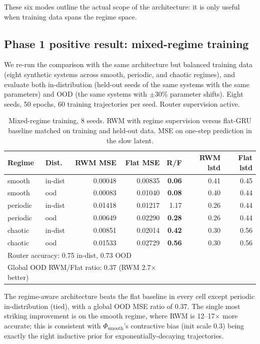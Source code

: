 \documentclass[11pt,a4paper]{article}
\begin{document}
These six modes outline the actual scope of the architecture: it is
only useful when training data spans the regime space.

\subsection{Phase 1 positive result: mixed-regime training}
\label{sec:rwm-mixed}

We re-run the comparison with the same architecture but balanced
training data (eight synthetic systems across smooth, periodic, and
chaotic regimes), and evaluate both in-distribution (held-out seeds of
the same systems with the same parameters) and OOD (the same systems
with $\pm$30\% parameter shifts). Eight seeds, 50 epochs, 60 training
trajectories per seed. Router supervision active.

\begin{table}[h]
\centering
\caption{Mixed-regime training, 8 seeds. RWM with regime supervision
versus flat-GRU baseline matched on training and held-out data. MSE
on one-step prediction in the slow latent.}
\label{tab:rwm-mixed}
\begin{tabular}{llrrrrr}
\toprule
Regime & Dist. & RWM MSE & Flat MSE & R/F & RWM lstd & Flat lstd \\
\midrule
smooth   & in-dist & 0.00048 & 0.00835 & \textbf{0.06} & 0.41 & 0.45 \\
smooth   & ood     & 0.00083 & 0.01040 & \textbf{0.08} & 0.40 & 0.44 \\
periodic & in-dist & 0.01418 & 0.01217 & 1.17 & 0.26 & 0.44 \\
periodic & ood     & 0.00649 & 0.02290 & \textbf{0.28} & 0.26 & 0.44 \\
chaotic  & in-dist & 0.00851 & 0.02014 & \textbf{0.42} & 0.30 & 0.56 \\
chaotic  & ood     & 0.01533 & 0.02729 & \textbf{0.56} & 0.30 & 0.56 \\
\midrule
\multicolumn{4}{l}{Router accuracy: 0.75 in-dist, 0.73 OOD} & & & \\
\multicolumn{4}{l}{Global OOD RWM/Flat ratio: 0.37 (RWM 2.7$\times$ better)} & & & \\
\bottomrule
\end{tabular}
\end{table}

The regime-aware architecture beats the flat baseline in every cell
except periodic in-distribution (tied), with a global OOD MSE ratio
of $0.37$. The single most striking improvement is on the smooth
regime, where RWM is 12--17$\times$ more accurate; this is consistent
with $\Phi_\text{smooth}$'s contractive bias (init scale $0.3$) being
exactly the right inductive prior for exponentially-decaying
trajectories.
\end{document}
